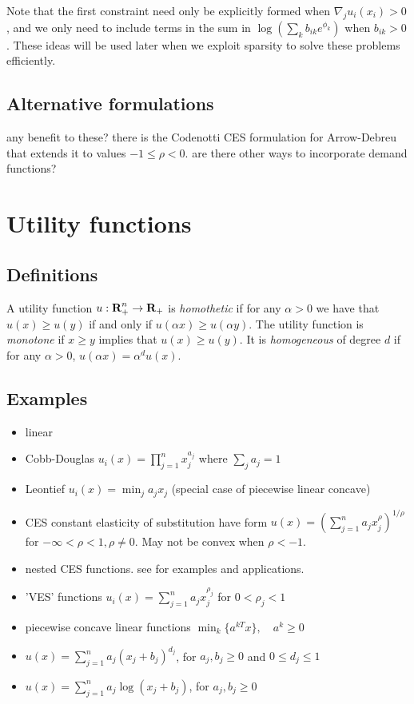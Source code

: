 \documentclass{article}
\begin{document}
Note that the first constraint need only be explicitly formed when $\nabla_j u_i(x_i) > 0$, and we only need to include terms in the sum in
$\log(\sum_k b_{ik} e^{\phi_k})$ when $b_{ik} > 0$. These ideas will be used later when we exploit sparsity to solve these problems efficiently.

\subsection{Alternative formulations}
any benefit to these? 
there is the Codenotti CES formulation for Arrow-Debreu that extends it to values $-1 \leq \rho < 0$. are there other ways to incorporate demand functions?

\section{Utility functions}
\subsection{Definitions}
A utility function $u: {\mbox{\bf R}}^n_+ \to {\mbox{\bf R}}_+$ is \emph{homothetic} if for any $\alpha > 0$ we have that $u(x) \geq u(y)$ if and only if
$u(\alpha x) \geq u(\alpha y)$.
The utility function is \emph{monotone} if $x \geq y$ implies that $u(x) \geq u(y)$.
It is \emph{homogeneous} of degree $d$ if for any $\alpha > 0$,
$u(\alpha x) = \alpha^d u(x)$.

\subsection{Examples}
\begin{itemize}
\item linear
\item Cobb-Douglas $u_i(x) = \prod_{j=1}^{n} x_j^{a_j}$ where $\sum_j a_j = 1$
\item Leontief $u_i(x) = \min_j a_j x_j$ (special case of piecewise linear concave)
\item CES constant elasticity of substitution have form
$u(x) = \left(\sum_{j=1}^n a_j x_j^\rho \right)^{1/\rho}$ for $-\infty < \rho <1, \rho \neq 0$. May not be convex when $\rho < -1$.
\item nested CES functions. see \cite{shoven1992applying} for examples and applications.  
\item 'VES' functions  $u_i(x) = \sum_{j=1}^{n} a_j x_j^{\rho_j}$ for $0 < \rho_j < 1$
\item piecewise concave linear functions $\min_k\lbrace a^{kT}x \rbrace,\quad a^k \geq 0$
\item $u(x) = \sum_{j=1}^n a_j (x_j+ b_j)^{d_j}$, for $a_j, b_j \geq 0$ and $0 \leq d_j \leq 1$
\item $u(x) = \sum_{j=1}^n a_j \log(x_j+ b_j)$, for $a_j, b_j \geq 0$
\end{itemize}
\end{document}

